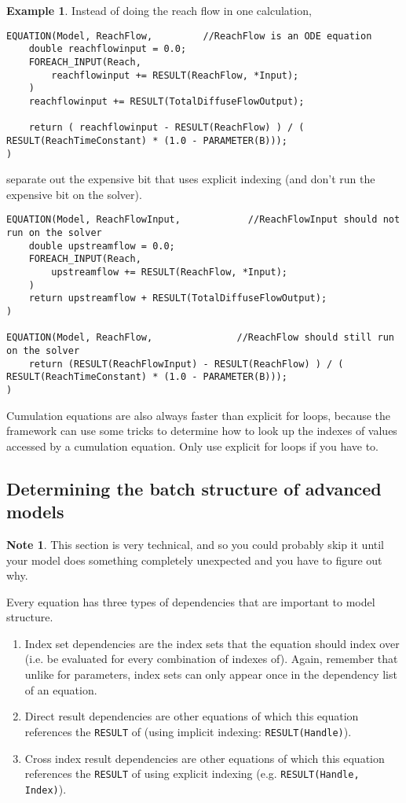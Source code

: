 \documentclass[11pt]{article}
\theoremstyle{definition}
\newtheorem{mynote}{Note}
\newenvironment{note}%
  {\begin{lrbox}{\notebox}%
   \begin{minipage}{\dimexpr\linewidth-2\fboxsep}
   \begin{mynote}}%
  {\end{mynote}%
   \end{minipage}%
   \end{lrbox}%
   \begin{trivlist}
     \item[]\colorbox{silver}{\usebox\notebox}
   \end{trivlist}}
\newtheorem{myexample}{Example}
\newenvironment{example}%
  {\begin{lrbox}{\examplebox}%
   \begin{minipage}{\dimexpr\linewidth-2\fboxsep}
   \begin{myexample}}%
  {\end{myexample}%
   \end{minipage}%
   \end{lrbox}%
   \begin{trivlist}
     \item[]\colorbox{silver}{\usebox\examplebox}
   \end{trivlist}}
\begin{document}
\begin{example}
Instead of doing the reach flow in one calculation,
\begin{lstlisting}[style=mycpp]
EQUATION(Model, ReachFlow,         //ReachFlow is an ODE equation
	double reachflowinput = 0.0;
	FOREACH_INPUT(Reach,
		reachflowinput += RESULT(ReachFlow, *Input);
	)
	reachflowinput += RESULT(TotalDiffuseFlowOutput);	

	return ( reachflowinput - RESULT(ReachFlow) ) / ( RESULT(ReachTimeConstant) * (1.0 - PARAMETER(B)));
)
\end{lstlisting}
separate out the expensive bit that uses explicit indexing (and don't run the expensive bit on the solver).
\begin{lstlisting}[style=mycpp]
EQUATION(Model, ReachFlowInput,            //ReachFlowInput should not run on the solver
	double upstreamflow = 0.0;
	FOREACH_INPUT(Reach,
		upstreamflow += RESULT(ReachFlow, *Input);
	)
	return upstreamflow + RESULT(TotalDiffuseFlowOutput);
)

EQUATION(Model, ReachFlow,               //ReachFlow should still run on the solver
	return (RESULT(ReachFlowInput) - RESULT(ReachFlow) ) / ( RESULT(ReachTimeConstant) * (1.0 - PARAMETER(B)));
)
\end{lstlisting}
\end{example}

Cumulation equations are also always faster than explicit for loops, because the framework can use some tricks to determine how to look up the indexes of values accessed by a cumulation equation. Only use explicit for loops if you have to.

\subsection{Determining the batch structure of advanced models}\label{sec:advancedbatchstructure}

\begin{note}
This section is very technical, and so you could probably skip it until your model does something completely unexpected and you have to figure out why.
\end{note}

Every equation has three types of dependencies that are important to model structure.
\begin{enumerate}[i]
\item Index set dependencies are the index sets that the equation should index over (i.e. be evaluated for every combination of indexes of). Again, remember that unlike for parameters, index sets can only appear once in the dependency list of an equation.
\item Direct result dependencies are other equations of which this equation references the {\tt RESULT} of (using implicit indexing: {\tt RESULT(Handle)}).
\item Cross index result dependencies are other equations of which this equation references the {\tt RESULT} of using explicit indexing (e.g. {\tt RESULT(Handle, Index)}).
\end{enumerate}
\end{document}
